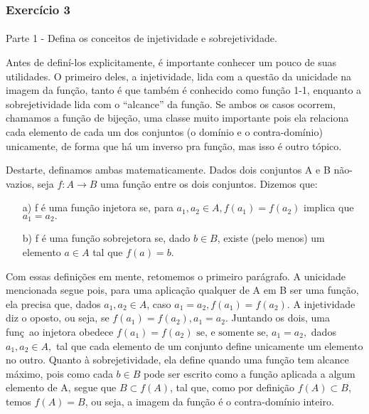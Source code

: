 \documentclass[exercícios_de_cálculo.tex]{subfiles}
\begin{document}
\subsubsection{Exercício 3}
\paragraph{}Parte 1  - Defina os conceitos de injetividade e sobrejetividade.
\begin{sol*}
	Antes de definí-los explicitamente, é importante conhecer um pouco de suas utilidades. O primeiro deles, a injetividade, lida com a questão da unicidade na imagem da função, tanto é que também é conhecido como funç\~ao 1-1, enquanto a sobrejetividade lida com o ``alcance'' da funç\~ao. Se ambos os casos ocorrem, chamamos a funç\~ao de bijeç\~ao, uma classe muito importante pois ela relaciona cada elemento de cada um dos conjuntos (o dom\'inio e o contra-dom\'inio) unicamente, de forma que há um inverso pra funç\~ao, mas isso é outro tópico.

	Destarte, definamos ambas matematicamente. Dados dois conjuntos A e B não-vazios, seja $f:A\rightarrow{B}$ uma função entre os dois conjuntos. Dizemos que:
	\begin{itemize}
		\item[a)] f é uma função injetora se, para $a_1, a_2\in{A}, f(a_1) = f(a_2)$ implica que $a_1 =  a_2.$
		\item[b)] f é uma função sobrejetora se, dado $b\in{B}$, existe (pelo menos) um elemento $a\in{A}$ tal que $f(a) = b.$
	\end{itemize}

	Com essas definições em mente, retomemos o primeiro parágrafo. A unicidade mencionada segue pois, para uma aplicação qualquer de A em B ser uma função, ela precisa que, dados $a_1, a_2\in{A}$, caso $a_1 = a_2, f(a_1) = f(a_2)$. A injetividade diz o oposto, ou seja, se $f(a_1) = f(a_2), a_1 = a_2$. Juntando os dois, uma funç~ao injetora obedece $f(a_1) = f(a_2) \text{ se, e somente se, } a_1 = a_2,$ dados $a_1, a_2\in{A},$ tal que cada elemento de um conjunto define unicamente um elemento no outro. Quanto à sobrejetividade, ela define quando uma funç\~ao tem alcance máximo, pois como cada $b\in{B}$ pode ser escrito como a funç\~ao aplicada a algum elemento de A, segue que $B \subset f(A)$, tal que, como por definiç\~ao $f(A) \subset B$, temos $f(A) = B$, ou seja, a imagem da funç\~ao é o contra-domínio inteiro.
	\qedsymbol
\end{sol*}
\end{document}

